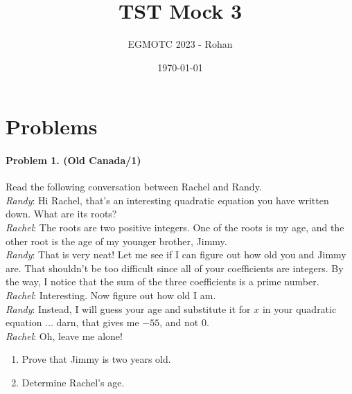 \documentclass[12pt]{article}
\title{TST Mock 3}
\author{EGMOTC 2023 - Rohan}
\date{\today}
\begin{document}
\maketitle

\newcommand{\localtextbulletone}{\textcolor{black}{\raisebox{.45ex}{\rule{.6ex}{.6ex}}}}
\renewcommand{\labelitemi}{\localtextbulletone}

\section*{Problems}
\vspace{0cm}
\thispagestyle{empty}

\paragraph{\textbf{Problem 1. (Old Canada/1)}} Read the following conversation between Rachel and Randy.\\ %

\textit{Randy}: Hi Rachel, that's an interesting quadratic equation you have written down. What are its roots?\\
\textit{Rachel}: The roots are two positive integers. One of the roots is my age, and the other root is the age of my younger brother, Jimmy.\\
\textit{Randy}: That is very neat! Let me see if I can figure out how old you and Jimmy are. That shouldn't be too difficult since all of your coefficients are integers. By the way, I notice that the sum of the three coefficients is a prime number.\\
\textit{Rachel}: Interesting. Now figure out how old I am.\\
\textit{Randy}: Instead, I will guess your age and substitute it for $x$ in your quadratic equation $\dots$ darn, that gives me $-55$, and not $0$.\\
\textit{Rachel}: Oh, leave me alone!

\begin{enumerate}
    \item Prove that Jimmy is two years old.
    \item Determine Rachel's age.
\end{enumerate}
\end{document}
